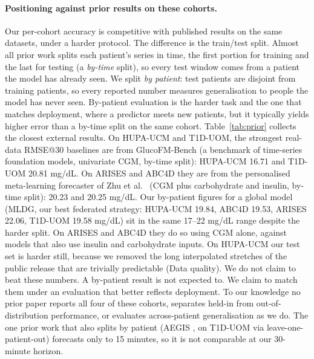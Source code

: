 \documentclass[10pt,letterpaper]{article}
\begin{document}
\paragraph{Positioning against prior results on these cohorts.} Our
per-cohort accuracy is competitive with published results on the same
datasets, under a harder protocol. The difference is the train/test split.
Almost all prior work splits each patient's series in time, the first
portion for training and the last for testing (a \emph{by-time} split), so
every test window comes from a patient the model has already seen. We split
\emph{by patient}: test patients are disjoint from training patients, so every
reported number measures generalisation to people the model has never seen.
By-patient evaluation is the harder task and the one that matches deployment,
where a predictor meets new patients, but it typically yields higher error
than a by-time split on the same cohort. Table~\ref{tab:prior} collects the
closest external results. On HUPA-UCM and T1D-UOM, the strongest real-data
RMSE@30 baselines are from GlucoFM-Bench \cite{lu2026glucofmbench} (a
benchmark of time-series foundation models, univariate CGM, by-time split):
HUPA-UCM 16.71 and T1D-UOM 20.81 mg/dL. On ARISES and ABC4D they are from the
personalised meta-learning forecaster of Zhu et al.\ \cite{zhu2023fcnn} (CGM
plus carbohydrate and insulin, by-time split): 20.23 and 20.25 mg/dL. Our
by-patient figures for a global model (MLDG, our best federated strategy:
HUPA-UCM 19.84, ABC4D 19.53, ARISES 22.06, T1D-UOM 19.58 mg/dL) sit in the
same 17--22 mg/dL range despite the harder split. On ARISES and ABC4D they do
so using CGM alone, against models that also use insulin and carbohydrate
inputs. On HUPA-UCM our test set is harder still, because we removed the
long interpolated stretches of the public release that are trivially
predictable (Data quality). We do not claim to beat these numbers. A
by-patient result is not expected to. We claim to match them under an
evaluation that better reflects deployment. To our knowledge no prior paper reports all four
of these cohorts, separates held-in from out-of-distribution performance, or
evaluates across-patient generalisation as we do. The one prior work that
also splits by patient (AEGIS \cite{pansheriya2026aegis}, on T1D-UOM via
leave-one-patient-out) forecasts only to 15 minutes, so it is not comparable
at our 30-minute horizon.
\end{document}
